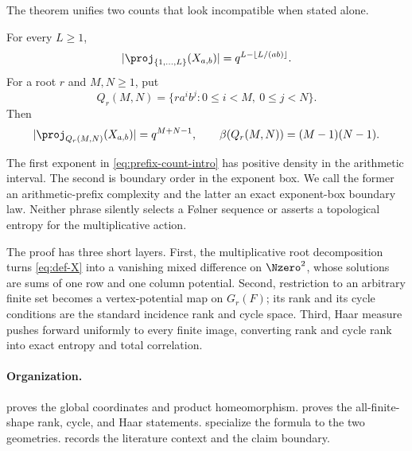 The theorem unifies two counts that look incompatible when stated alone.

\begin{corollary}\label{cor:two-geometries}
For every $L\geq1$,
\begin{equation}\label{eq:prefix-count-intro}
 |\proj_{\{1,\ldots,L\}}(X_{a,b})|
 =q^{L-\lfloor L/(ab)\rfloor}.
\end{equation}
For a root $r$ and $M,N\geq1$, put
\[
 Q_r(M,N)=\{r a^i b^j:0\leq i<M,\ 0\leq j<N\}.
\]
Then
\begin{equation}\label{eq:rectangle-count-intro}
 |\proj_{Q_r(M,N)}(X_{a,b})|=q^{M+N-1},
 \qquad
 \beta(Q_r(M,N))=(M-1)(N-1).
\end{equation}
\end{corollary}

The first exponent in \eqref{eq:prefix-count-intro} has positive density in
the arithmetic interval.  The second is boundary order in the exponent box.
We call the former an arithmetic-prefix complexity and the latter an exact
exponent-box boundary law.  Neither phrase silently selects a F\o lner
sequence or asserts a topological entropy for the multiplicative action.

The proof has three short layers.  First, the multiplicative root
decomposition turns \eqref{eq:def-X} into a vanishing mixed difference on
$\Nzero^2$, whose solutions are sums of one row and one column potential.
Second, restriction to an arbitrary finite set becomes a vertex-potential map
on $G_r(F)$; its rank and its cycle conditions are the standard incidence
rank and cycle space.  Third, Haar measure pushes forward uniformly to every
finite image, converting rank and cycle rank into exact entropy and total
correlation.

\paragraph{Organization.}
 proves the global coordinates and product
homeomorphism.   proves the all-finite-shape rank, cycle, and
Haar statements.   specialize the formula
to the two geometries.   records the literature context and the
claim boundary.
